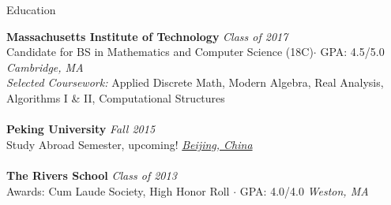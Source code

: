 \documentclass{resume} %
\begin{document}

\begin{rSection}{Education}

{\bf Massachusetts Institute of Technology} \hfill {\em Class of 2017} 
\\ Candidate for BS in Mathematics and Computer Science (18C)$\cdot$ GPA: 4.5/5.0 \hfill {\em Cambridge, MA} 
\\ {\em Selected Coursework:} 
Applied Discrete Math, Modern Algebra, Real Analysis, 
Algorithms I \& II, Computational Structures
\\
\\ {\bf Peking University} \hfill {\em Fall 2015} 
\\ Study Abroad Semester, upcoming! \hfill \underline{\em Beijing, China}
\\
\\ {\bf The Rivers School} \hfill {\em Class of 2013}
\\ Awards: Cum Laude Society, High Honor Roll $\cdot$ GPA: 4.0/4.0 \hfill {\em Weston, MA}

\end{rSection}

\end{document}
